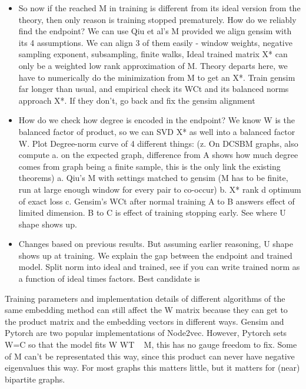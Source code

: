 \documentclass[aps,pre,reprint,superscriptaddress,longbibliography]{revtex4-2}
\begin{document}
\begin{itemize}
    \item So now if the reached M in training is different from its ideal version from the theory, then only reason is training stopped prematurely.
    How do we reliably find the endpoint? We can use Qiu et al's M provided we align gensim with its 4 assumptions.
    We can align 3 of them easily - window weights, negative sampling exponent, subsampling, finite walks, 
    Ideal trained matrix X* can only be a weighted low rank approximation of M.
    Theory departs here, we have to numerically do the minimization from M to get an X*.
    Train gensim far longer than usual, and empirical check its WCt and its balanced norms approach X*. 
    If they don't, go back and fix the gensim alignment
    
    \item How do we check how degree is encoded in the endpoint?
    We know W is the balanced factor of product, so we can SVD X* as well into a balanced factor W. 
    Plot Degree-norm curve of 4 different things:
    (z. On DCSBM graphs, also compute a. on the expected graph, difference from A shows how much degree comes from graph being a finite sample, this is the only link the existing theorems)
    a. Qiu's M with settings matched to gensim (M has to be finite, run at large enough window for every pair to co-occur)
    b. X* rank d optimum of exact loss 
    c. Gensim's WCt after normal training
    A to B answers effect of limited dimension. B to C is effect of training stopping early.
    See where U shape shows up.

    \item Changes based on previous results. But assuming earlier reasoning, U shape shows up at training.
    We explain the gap between the endpoint and trained model.
    Split norm into ideal and trained, see if you can write trained norm as a function of ideal times factors.
    Best candidate is 

\end{itemize}

Training parameters and implementation details of different algorithms of the same embedding method can still affect the W matrix because they can get to the product matrix and the embedding vectors in different ways.
Gensim and Pytorch are two popular implementations of Node2vec. 
However, Pytorch sets W=C so that the model fits W WT ~ M, this has no gauge freedom to fix. 
Some of M can't be representated this way, since this product can never have negative eigenvalues this way. For most graphs this matters little, but it matters for (near) bipartite graphs.
\end{document}
